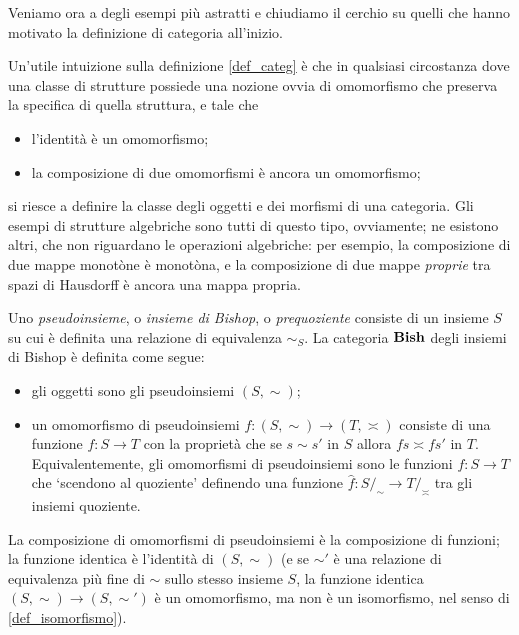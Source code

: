 Veniamo ora a degli esempi più astratti e chiudiamo il cerchio su quelli che hanno motivato la definizione di categoria all'inizio.

Un'utile intuizione sulla definizione \ref{def_categ} è che in qualsiasi circostanza dove una classe di strutture possiede una nozione ovvia di omomorfismo che preserva la specifica di quella struttura, e tale che
\begin{itemize}
	\item l'identità è un omomorfismo;
	\item la composizione di due omomorfismi è ancora un omomorfismo;
\end{itemize}
si riesce a definire la classe degli oggetti e dei morfismi di una categoria. Gli esempi di strutture algebriche sono tutti di questo tipo, ovviamente; ne esistono altri, che non riguardano le operazioni algebriche: per esempio, la composizione di due mappe monotòne è monotòna, e la composizione di due mappe \emph{proprie} tra spazi di Hausdorff è ancora una mappa propria.
\begin{example}
	Uno \emph{pseudoinsieme}, o \emph{insieme di Bishop}, o \emph{prequoziente} consiste di un insieme \(S\) su cui è definita una relazione di equivalenza \(\sim_S\). La categoria \(\mathbf{Bish}\) degli insiemi di Bishop è definita come segue:
	\begin{itemize}
		\item gli oggetti sono gli pseudoinsiemi \((S,\sim)\);
		\item un omomorfismo di pseudoinsiemi \(f : (S,\sim) \to (T,\asymp)\) consiste di una funzione \(f : S\to T\) con la proprietà che se \(s\sim s'\) in \(S\) allora \(fs\asymp fs'\) in \(T\). Equivalentemente, gli omomorfismi di pseudoinsiemi sono le funzioni \(f : S\to T\) che `scendono al quoziente' definendo una funzione \(\hat f : S/_\sim \to T/_\asymp\) tra gli insiemi quoziente.
	\end{itemize}
	La composizione di omomorfismi di pseudoinsiemi è la composizione di funzioni; la funzione identica è l'identità di \((S,\sim)\) (e se \(\sim'\) è una relazione di equivalenza più fine di \(\sim\) sullo stesso insieme \(S\), la funzione identica \((S,\sim) \to (S,\sim')\) è un omomorfismo, ma non è un isomorfismo, nel senso di \ref{def_isomorfismo}).
\end{example}
